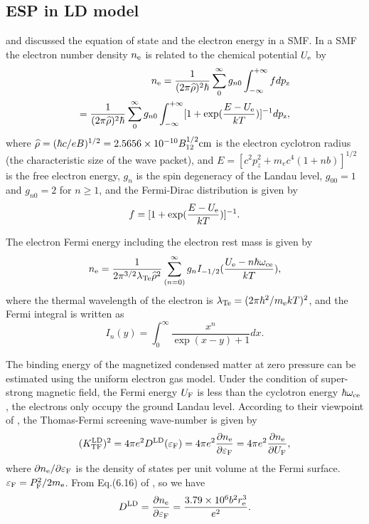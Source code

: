 \documentclass[manuscript]{aastex}
\begin{document}
\subsection{ESP in LD model}
\citet{Lai01} and \citet{Lai91} discussed the equation of state and
the electron energy in a SMF. In a SMF the electron number density
$n_{\rm{e}}$ is related to the chemical potential $U_{\rm{e}}$ by
\begin{eqnarray}
 n_{\rm{e}}=\frac{1}{(2\pi\widehat{\rho})^2\hbar}\sum_0^\infty g_{n0} \int_{-\infty} ^{+\infty} f dp_{\rm{z}}\nonumber\\
 =\frac{1}{(2\pi\widehat{\rho})^2\hbar}\sum_0^\infty g_{n0}\int_{-\infty}^{+\infty}[1+\exp(\frac{E-U_{\rm{e}}}{kT})]^{-1}dp_{\rm{z}},
\label{17}
\end{eqnarray}
where $\widehat{\rho}=(\hbar
c/eB)^{1/2}=2.5656\times10^{-10}B_{12}^{1/2}\rm{cm}$ is the electron
cyclotron radius (the characteristic size of the wave packet), and
$E=[c^2p_z^2+m_ec^4(1+nb)]^{1/2}$ is the free electron energy,
$g_{n}$ is the spin degeneracy of the Landau level, $g_{00}=1$ and
$g_{n0}=2$ for $n\geqslant 1$, and the Fermi-Dirac distribution is
given by
\begin{equation}
f=[1+\exp(\frac{E-U_{\rm{e}}}{kT})]^{-1}. \label{19}
\end{equation}


The electron Fermi energy including the electron rest mass is given
by
\begin{equation}
 n_{\rm{e}}=\frac{1}{2\pi^{3/2}\lambda_{\rm{Te}}\widehat{\rho}^2}\sum_{(n=0)}^{\infty} g_{n}I_{-1/2}(\frac{U_{\rm{e}}-n\hbar\omega_{\rm{ce}}}{kT}),
\label{20}
\end{equation}
where the thermal wavelength of the electron is
$\lambda_{\rm{Te}}=(2\pi\hbar^2/m_{\rm{e}} kT)^2$, and the Fermi
integral is written as
\begin{equation}
I_{n}(y)=\int_0^\infty \frac{x^{n}}{\exp(x-y)+1}dx. \label{21}
\end{equation}


The binding energy of the magnetized condensed matter at zero
pressure can be estimated using the uniform electron gas model.
Under the condition of super-strong magnetic field, the Fermi energy
$U_{\rm{F}}$ is less than the cyclotron energy
$\hbar\omega_{\rm{ce}}$, the electrons only occupy the ground Landau
level. According to their viewpoint of \citep{Lai01}, the
Thomas-Fermi screening wave-number is given by
\begin{equation}
 (K_{\rm{TF}}^{\rm{LD}})^2=4\pi e^2D^{\rm{LD}}(\varepsilon_{\rm{F}})=4\pi e^2 \frac{\partial n_{\rm{e}}}{\partial \varepsilon_{\rm{F}}}=4\pi e^2 \frac{\partial
n_{\rm{e}}}{\partial U_{\rm{F}}}, \label{22}
\end{equation}
where $\partial n_{\rm{e}}/\partial \varepsilon_{\rm{F}}$ is the
density of states per unit volume at the Fermi surface.
$\varepsilon_{\rm{F}}=P_{\rm{F}}^2/2m_{\rm{e}}$. From Eq.(6.16) of
\citet{Lai01}, so we have
\begin{equation}
 D^{\rm{LD}}=\frac{\partial n_{\rm{e}}}{\partial \varepsilon_{\rm{F}}}=\frac{3.79\times10^6b^2r_{\rm{e}}^3}{e^2}.
\label{23}
\end{equation}
\end{document}
